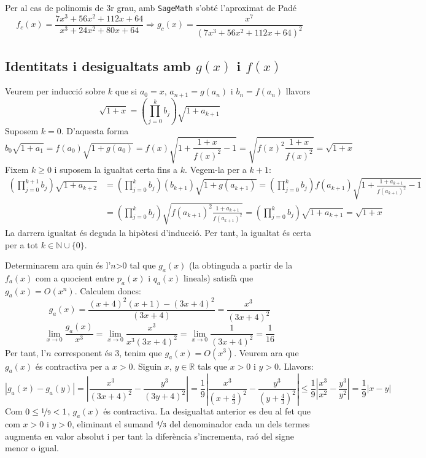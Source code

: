 \documentclass[a4paper,10.4pt]{article}
\newcommand{\N}{\mathbb{N}}
\begin{document}
Per al cas de polinomis de $3$r grau, amb \texttt{SageMath} s'obté l'aproximat de Padé
\begin{equation*}
	f_c(x)=\frac{7x^3+56x^2+112x+64}{x^3+24x^2+80x+64}\Rightarrow g_c(x)=\frac{x^7}{(7x^3+56x^2+112x+64)^2}
\end{equation*}
\subsection{Identitats i desigualtats amb $g(x)$ i $f(x)$}
Veurem per inducció sobre $k$ que si $a_0=x$, $a_{n+1}=g(a_n)$ i $b_n=f(a_n)$ llavors
\begin{equation}
	\sqrt{1+x}=\left(\prod_{j=0}^{k}b_j\right)\sqrt{1+a_{k+1}}\label{eq1}
\end{equation}
Suposem $k=0$. D'aquesta forma
\begin{equation*}
	b_0\sqrt{1+a_1}=f(a_0)\sqrt{1+g(a_0)}=f(x)\sqrt{1+\frac{1+x}{f(x)^2}-1}=\sqrt{f(x)^2\frac{1+x}{f(x)^2}}=\sqrt{1+x}
\end{equation*}
Fixem $k\geq 0$ i suposem la igualtat certa fins a $k$. Vegem-la per a $k+1$:
\begin{align*}
	\left(\prod_{j=0}^{k+1}b_j\right)\sqrt{1+a_{k+2}}&=\left(\prod_{j=0}^{k}b_j\right)(b_{k+1})\sqrt{1+g(a_{k+1})}= \left(\prod_{j=0}^{k}b_j\right)f(a_{k+1})\sqrt{1+\frac{1+a_{k+1}}{f(a_{k+1})^2}-1}\\&=\left(\prod_{j=0}^{k}b_j\right)\sqrt{f(a_{k+1})^2\frac{1+a_{k+1}}{f(a_{k+1})^2}}=\left(\prod_{j=0}^{k}b_j\right)\sqrt{1+a_{k+1}}=\sqrt{1+x}
\end{align*}
La darrera igualtat és deguda la hipòtesi d'inducció. Per tant, la igualtat és certa per a tot $k\in\N\cup\{0\}$.

Determinarem ara quin és l'$n$>0 tal que $g_a(x)$ (la obtinguda a partir de la $f_a(x)$ com a quocient entre $p_a(x)$ i $q_a(x)$ lineals) satisfà que $g_a(x)=O(x^n)$. Calculem doncs:
\begin{equation*}
	g_a(x)=\frac{(x+4)^2(x+1)-(3x+4)^2}{(3x+4)}=\frac{x^3}{(3x+4)^2}
\end{equation*}
\begin{equation*}
	\lim\limits_{x\rightarrow 0}\frac{g_a(x)}{x^3}=\lim\limits_{x\rightarrow 0}\frac{x^3}{x^3(3x+4)^2}=\lim\limits_{x\rightarrow 0}\frac{1}{(3x+4)^2}=\frac{1}{16}
\end{equation*}
Per tant, l'$n$ corresponent és $3$, tenim que $g_a(x)=O(x^3)$. Veurem ara que $g_a(x)$ és contractiva per a $x>0$. Siguin $x$, $y\in\mathbb{R}$ tals que $x>0$ i $y>0$. Llavors:
\begin{equation*}
	\left|g_a(x)-g_a(y)\right|=\left|\frac{x^3}{(3x+4)^2}-\frac{y^3}{(3y+4)^2}\right|=\frac{1}{9}\left|\frac{x^3}{(x+\frac{4}{3})^2}-\frac{y^3}{(y+\frac{4}{3})^2}\right|\leq\frac{1}{9}\left|\frac{x^3}{x^2}-\frac{y^3}{y^2}\right|=\frac{1}{9}\left|x-y\right|
\end{equation*}
Com $0\leq\nicefrac{1}{9}<1$, $g_a(x)$ és contractiva. La desigualtat anterior es deu al fet que com $x>0$ i $y>0$, eliminant el sumand $\nicefrac{4}{3}$ del denominador cada un dels termes augmenta en valor absolut i per tant la diferència s'incrementa, raó del signe menor o igual.
\end{document}
